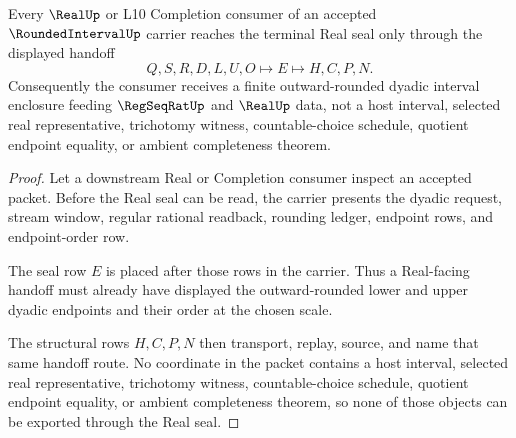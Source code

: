 \begin{theorem}
\label{thm:rounded-interval-real-seal-handoff}
Every $\RealUp$ or L10 Completion consumer of an accepted $\RoundedIntervalUp$ carrier reaches the terminal Real seal only through the displayed handoff
$$
Q,S,R,D,L,U,O \longmapsto E \longmapsto H,C,P,N .
$$
Consequently the consumer receives a finite outward-rounded dyadic interval enclosure feeding $\RegSeqRatUp$ and $\RealUp$ data, not a host interval, selected real representative, trichotomy witness, countable-choice schedule, quotient endpoint equality, or ambient completeness theorem.
\end{theorem}
\begin{proof}
Let a downstream Real or Completion consumer inspect an accepted packet. Before the Real seal can be read, the carrier presents the dyadic request, stream window, regular rational readback, rounding ledger, endpoint rows, and endpoint-order row.

The seal row $E$ is placed after those rows in the carrier. Thus a Real-facing handoff must already have displayed the outward-rounded lower and upper dyadic endpoints and their order at the chosen scale.

The structural rows $H,C,P,N$ then transport, replay, source, and name that same handoff route. No coordinate in the packet contains a host interval, selected real representative, trichotomy witness, countable-choice schedule, quotient endpoint equality, or ambient completeness theorem, so none of those objects can be exported through the Real seal.
\end{proof}


\begin{closurestatus}{\RoundedIntervalUp}
  \theoryclosure{\seedClosure}
  \formalstatus{\unformalizedV}
\end{closurestatus}

